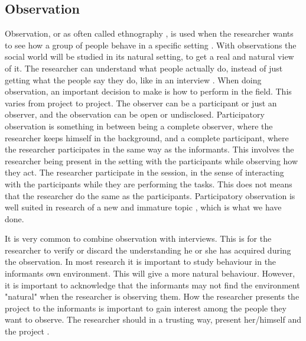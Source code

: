 \subsection{Observation}
\label{subsec:observation}
Observation, or as often called ethnography \cite{tjora}, is used when the researcher wants to see how a group of people behave in a specific setting \cite{qualitative}. With observations the social world will be studied in its natural setting, to get a real and natural view of it. The researcher can understand what people actually do, instead of just getting what the people say they do, like in an interview \cite{tjora}. When doing observation, an important decision to make is how to perform in the field. This varies from project to project. The observer can be a participant or just an observer, and the observation can be open or undisclosed. Participatory observation is something in between being a complete observer, where the researcher keeps himself in the background, and a complete participant, where the researcher participates in the same way as the informants. This involves the researcher being present in the setting with the participants while observing how they act. The researcher participate in the session, in the sense of interacting with the participants while they are performing the tasks. This does not means that the researcher do the same as the participants. Participatory observation is well suited in research of a new and immature topic \cite{qualitative}, which is what we have done.

It is very common to combine observation with interviews. This is for the researcher to verify or discard the understanding he or she has acquired during the observation. In most research it is important to study behaviour in the informants own environment. This will give a more natural behaviour. However, it is important to acknowledge that the informants may not find the environment "natural" when the researcher is observing them. How the researcher presents the project to the informants is important to gain interest among the people they want to observe. The researcher should in a trusting way, present her/himself and the project \cite{qualitative}.

